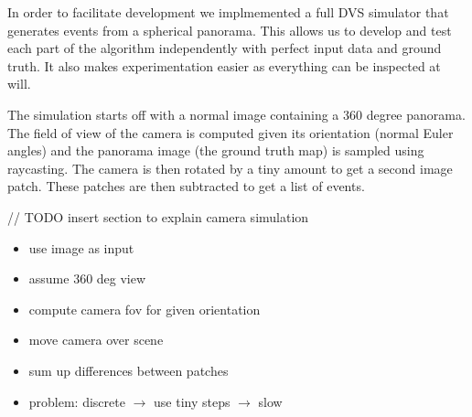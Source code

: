 In order to facilitate development we implmemented a full DVS simulator that
generates events from a spherical panorama.  This allows us to develop and test
each part of the algorithm independently with perfect input data and ground
truth. It also makes experimentation easier as everything can be inspected at
will.

The simulation starts off with a normal image containing a 360 degree panorama. The field of view of the camera is computed given its orientation (normal Euler angles) and the panorama image (the ground truth map) is sampled using raycasting. The camera is then rotated by a tiny amount to get a second image patch. These patches are then subtracted to get a list of events.

// TODO insert section to explain camera simulation

\begin{itemize}
\item use image as input
\item assume 360 deg view
\item compute camera fov for given orientation
\item move camera over scene
\item sum up differences between patches
\item problem: discrete
	$\rightarrow$ use tiny steps
		$\rightarrow$ slow
\end{itemize}


